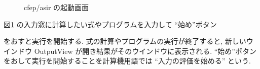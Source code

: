 \documentclass{jbook}
\begin{document}
\begin{figure}[tb]
\caption{ cfep/asir の起動画面} \label{fig:cfepStart}
\end{figure}

図\ref{fig:cfepStart} の入力窓に計算したい式やプログラムを入力して
``始め''ボタン
\begin{center}
\end{center}
をおすと実行を開始する.
式の計算やプログラムの実行が終了すると,
新しいウインドウ OutputView が開き結果がそのウインドウに表示される.
``始め''ボタンをおして実行を開始することを計算機用語では 
``入力の評価を始める'' という.
\index{;}  
\end{document}
